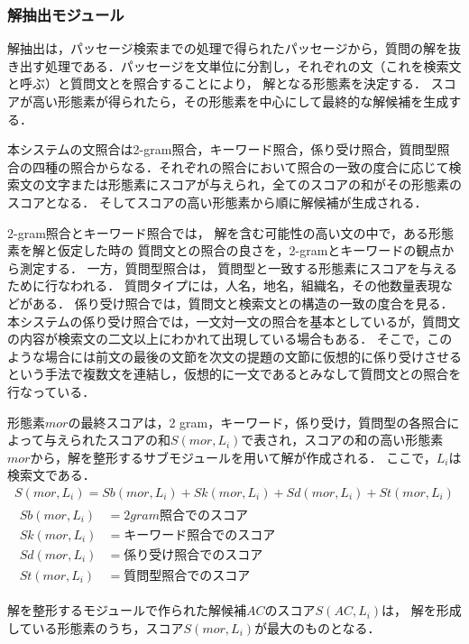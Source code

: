 \documentclass[japanese]{jnlp_1.4}
\begin{document}
\subsubsection{解抽出モジュール}\label{subsec:解生成}

解抽出は，パッセージ検索までの処理で得られたパッセージから，質問の解を抜き出す処理である．パッセージを文単位に分割し，それぞれの文（これを検索文と呼ぶ）と質問文とを照合することにより，
解となる形態素を決定する．
スコアが高い形態素が得られたら，その形態素を中心にして最終的な解候補を生成する．

本システムの文照合は2-gram照合，キーワード照合，係り受け照合，質問型照合の四種の照合からなる．それぞれの照合において照合の一致の度合に応じて検索文の文字または形態素にスコアが与えられ，全てのスコアの和がその形態素のスコアとなる．
そしてスコアの高い形態素から順に解候補が生成される．

2-gram照合とキーワード照合では，
解を含む可能性の高い文の中で，ある形態素を解と仮定した時の
質問文との照合の良さを，2-gramとキーワードの観点から測定する．
一方，質問型照合は，
質問型と一致する形態素にスコアを与えるために行なわれる．
質問タイプには，人名，地名，組織名，その他数量表現などがある．
係り受け照合では，質問文と検索文との構造の一致の度合を見る．
本システムの係り受け照合では，一文対一文の照合を基本としているが，質問文の内容が検索文の二文以上にわかれて出現している場合もある．
そこで，このような場合には前文の最後の文節を次文の提題の文節に仮想的に係り受けさせるという手法で複数文を連結し，仮想的に一文であるとみなして質問文との照合を行なっている．

形態素$mor$の最終スコアは，2 gram，キーワード，係り受け，質問型の各照合によって与えられたスコアの和$S(mor,L_i)$で表され，スコアの和の高い形態素$mor$から，解を整形するサブモジュールを用いて解が作成される．
ここで，$L_i$は検索文である．
\begin{gather}
S(mor,L_i) = Sb(mor,L_i) + Sk(mor,L_i) + Sd(mor,L_i) +St(mor,L_i) \\
\begin{split}
 Sb(mor,L_i)&= 2 gram照合でのスコア\\
Sk(mor,L_i) &= キーワード照合でのスコア\\
Sd(mor,L_i)&= 係り受け照合でのスコア\\
St(mor,L_i) &= 質問型照合でのスコア
\end{split}
\nonumber
\end{gather}

解を整形するモジュールで作られた解候補$AC$のスコア$S(AC,L_i)$は，
解を形成している形態素のうち，スコア$S(mor,L_i)$が最大のものとなる．
\end{document}
